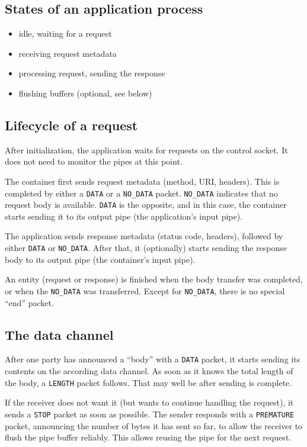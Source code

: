 \documentclass[a4paper,12pt]{article}
\begin{document}
\subsection{States of an application process}

\begin{itemize}
\item idle, waiting for a request
\item receiving request metadata
\item processing request, sending the response
\item flushing buffers (optional, see below)
\end{itemize}

\subsection{Lifecycle of a request}

After initialization, the application waits for requests on the
control socket.  It does not need to monitor the pipes at this point.

The container first sends request metadata (method, URI, headers).
This is completed by either a \texttt{DATA} or a \texttt{NO\_DATA}
packet.  \texttt{NO\_DATA} indicates that no request body is
available.  \texttt{DATA} is the opposite, and in this case, the
container starts sending it to its output pipe (the application's
input pipe).

The application sends response metadata (status code, headers),
followed by either \texttt{DATA} or \texttt{NO\_DATA}.  After that, it
(optionally) starts sending the response body to its output pipe (the
container's input pipe).

An entity (request or response) is finished when the body transfer was
completed, or when the \texttt{NO\_DATA} was transferred.  Except for
\texttt{NO\_DATA}, there is no special ``end'' packet.

\subsection{The data channel}

After one party has announced a ``body'' with a \texttt{DATA} packet,
it starts sending its contents on the according data channel.  As soon
as it knows the total length of the body, a \texttt{LENGTH} packet
follows.  That may well be after sending is complete.

If the receiver does not want it (but wants to continue handling the
request), it sends a \texttt{STOP} packet as soon as possible.  The
sender responds with a \texttt{PREMATURE} packet, announcing the number
of bytes it has sent so far, to allow the receiver to flush the pipe
buffer reliably.  This allows reusing the pipe for the next request.
\end{document}
